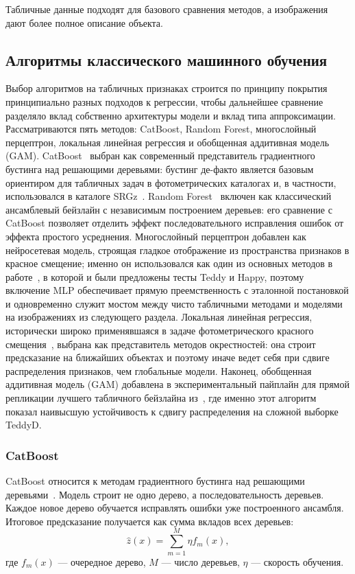 \documentclass[12pt,a4paper]{article}
\begin{document}
Табличные данные подходят для базового сравнения методов, а изображения дают более полное описание объекта.

\subsection{Алгоритмы классического машинного обучения}

Выбор алгоритмов на табличных признаках строится по принципу покрытия принципиально разных подходов к регрессии, чтобы дальнейшее сравнение разделяло вклад собственно архитектуры модели и вклад типа аппроксимации. Рассматриваются пять методов: CatBoost, Random Forest, многослойный перцептрон, локальная линейная регрессия и обобщенная аддитивная модель (GAM). CatBoost~\cite{dorogush2018catboost} выбран как современный представитель градиентного бустинга над решающими деревьями: бустинг де-факто является базовым ориентиром для табличных задач в фотометрических каталогах и, в частности, использовался в каталоге SRGz~\cite{meshcheryakov2022}. Random Forest~\cite{breiman2001randomforest} включен как классический ансамблевый бейзлайн с независимым построением деревьев: его сравнение с CatBoost позволяет отделить эффект последовательного исправления ошибок от эффекта простого усреднения. Многослойный перцептрон добавлен как нейросетевая модель, строящая гладкое отображение из пространства признаков в красное смещение; именно он использовался как один из основных методов в работе~\cite{beck2017}, в которой и были предложены тесты Teddy и Happy, поэтому включение MLP обеспечивает прямую преемственность с эталонной постановкой и одновременно служит мостом между чисто табличными методами и моделями на изображениях из следующего раздела. Локальная линейная регрессия, исторически широко применявшаяся в задаче фотометрического красного смещения~\cite{beck2017,newman2022}, выбрана как представитель методов окрестностей: она строит предсказание на ближайших объектах и поэтому иначе ведет себя при сдвиге распределения признаков, чем глобальные модели. Наконец, обобщенная аддитивная модель (GAM) добавлена в экспериментальный пайплайн для прямой репликации лучшего табличного бейзлайна из~\cite{beck2017}, где именно этот алгоритм показал наивысшую устойчивость к сдвигу распределения на сложной выборке TeddyD.

\subsubsection{CatBoost}

CatBoost относится к методам градиентного бустинга над решающими деревьями~\cite{dorogush2018catboost}. Модель строит не одно дерево, а последовательность деревьев. Каждое новое дерево обучается исправлять ошибки уже построенного ансамбля. Итоговое предсказание получается как сумма вкладов всех деревьев:
\begin{equation}
\hat{z}(x) = \sum_{m=1}^{M} \eta f_m(x),
\end{equation}
где $f_m(x)$ — очередное дерево, $M$ — число деревьев, $\eta$ — скорость обучения.
\end{document}
